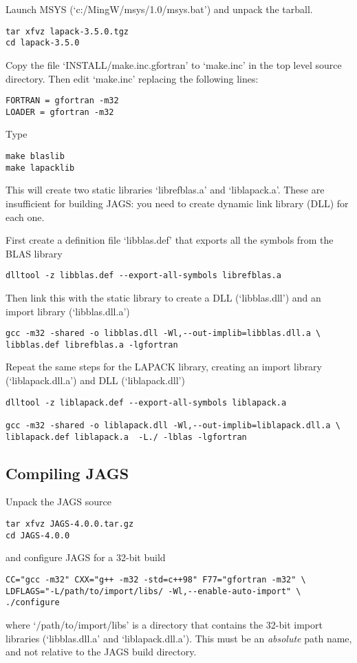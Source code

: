 \documentclass[11pt, a4paper, titlepage]{article}
\newcommand{\JAGS}{\textsf{JAGS}}
\newcommand{\file}[1]{{`\normalfont\textsf{#1}'}}
\begin{document}
Launch MSYS (\file{c:/MingW/msys/1.0/msys.bat}) and unpack the tarball.
\begin{verbatim}
tar xfvz lapack-3.5.0.tgz
cd lapack-3.5.0
\end{verbatim}
Copy the file \file{INSTALL/make.inc.gfortran} to \file{make.inc} in
the top level source directory.  Then edit \file{make.inc} replacing
the following lines:
\begin{verbatim}
FORTRAN = gfortran -m32
LOADER = gfortran -m32
\end{verbatim}
Type
\begin{verbatim}
make blaslib
make lapacklib 
\end{verbatim}
This will create two static libraries \file{librefblas.a} and
\file{liblapack.a}. These are insufficient for building \JAGS: you
need to create dynamic link library (DLL) for each one.

First create a definition file \file{libblas.def} that exports all the
symbols from the BLAS library
\begin{verbatim}
dlltool -z libblas.def --export-all-symbols librefblas.a
\end{verbatim}
Then link this with the static library to create a DLL
(\file{libblas.dll}) and an import library (\file{libblas.dll.a})
\begin{verbatim}
gcc -m32 -shared -o libblas.dll -Wl,--out-implib=libblas.dll.a \
libblas.def librefblas.a -lgfortran 
\end{verbatim}
 
Repeat the same steps for the LAPACK library, creating an import library
(\file{liblapack.dll.a}) and DLL (\file{liblapack.dll})
\begin{verbatim}
dlltool -z liblapack.def --export-all-symbols liblapack.a

gcc -m32 -shared -o liblapack.dll -Wl,--out-implib=liblapack.dll.a \
liblapack.def liblapack.a  -L./ -lblas -lgfortran 
\end{verbatim}

\subsection{Compiling \JAGS}

Unpack the JAGS source
\begin{verbatim}
tar xfvz JAGS-4.0.0.tar.gz
cd JAGS-4.0.0
\end{verbatim}
and configure JAGS for a 32-bit build
\begin{verbatim}
CC="gcc -m32" CXX="g++ -m32 -std=c++98" F77="gfortran -m32" \
LDFLAGS="-L/path/to/import/libs/ -Wl,--enable-auto-import" \
./configure
\end{verbatim}
where \file{/path/to/import/libs} is a directory that contains the
32-bit import libraries (\file{libblas.dll.a} and
\file{liblapack.dll.a}).  This must be an {\em absolute} path name,
and not relative to the JAGS build directory.
\end{document}
